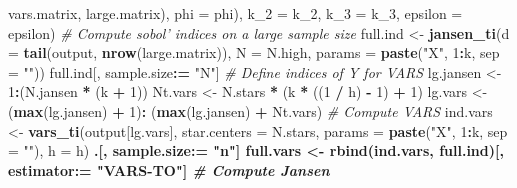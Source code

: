 \documentclass[11pt,]{article}
\newenvironment{Shaded}{\begin{snugshade}}{\end{snugshade}}
\newcommand{\CommentTok}[1]{\textcolor[rgb]{0.56,0.35,0.01}{\textit{#1}}}
\newcommand{\DataTypeTok}[1]{\textcolor[rgb]{0.13,0.29,0.53}{#1}}
\newcommand{\DecValTok}[1]{\textcolor[rgb]{0.00,0.00,0.81}{#1}}
\newcommand{\ErrorTok}[1]{\textcolor[rgb]{0.64,0.00,0.00}{\textbf{#1}}}
\newcommand{\KeywordTok}[1]{\textcolor[rgb]{0.13,0.29,0.53}{\textbf{#1}}}
\newcommand{\NormalTok}[1]{#1}
\newcommand{\OperatorTok}[1]{\textcolor[rgb]{0.81,0.36,0.00}{\textbf{#1}}}
\newcommand{\StringTok}[1]{\textcolor[rgb]{0.31,0.60,0.02}{#1}}
\begin{document}
\begin{Shaded}
\begin{Highlighting}[]
\NormalTok{                                                                         vars.matrix, }
\NormalTok{                                                                         large.matrix), }
                                                               \DataTypeTok{phi =}\NormalTok{ phi), }
                                   \DataTypeTok{k_2 =}\NormalTok{ k_}\DecValTok{2}\NormalTok{, }\DataTypeTok{k_3 =}\NormalTok{ k_}\DecValTok{3}\NormalTok{, }\DataTypeTok{epsilon =}\NormalTok{ epsilon)}
  \CommentTok{# Compute sobol' indices on a large sample size}
\NormalTok{  full.ind <-}\StringTok{ }\KeywordTok{jansen_ti}\NormalTok{(}\DataTypeTok{d =} \KeywordTok{tail}\NormalTok{(output, }\KeywordTok{nrow}\NormalTok{(large.matrix)), }
                        \DataTypeTok{N =}\NormalTok{ N.high, }
                        \DataTypeTok{params =} \KeywordTok{paste}\NormalTok{(}\StringTok{"X"}\NormalTok{, }\DecValTok{1}\OperatorTok{:}\NormalTok{k, }\DataTypeTok{sep =} \StringTok{""}\NormalTok{))}
\NormalTok{  full.ind[, sample.size}\OperatorTok{:}\ErrorTok{=}\StringTok{ "N"}\NormalTok{]}
  \CommentTok{# Define indices of Y for VARS}
\NormalTok{  lg.jansen <-}\StringTok{ }\DecValTok{1}\OperatorTok{:}\NormalTok{(N.jansen }\OperatorTok{*}\StringTok{ }\NormalTok{(k }\OperatorTok{+}\StringTok{ }\DecValTok{1}\NormalTok{))}
\NormalTok{  Nt.vars <-}\StringTok{ }\NormalTok{N.stars }\OperatorTok{*}\StringTok{ }\NormalTok{(k }\OperatorTok{*}\StringTok{ }\NormalTok{((}\DecValTok{1} \OperatorTok{/}\StringTok{ }\NormalTok{h) }\OperatorTok{-}\StringTok{ }\DecValTok{1}\NormalTok{) }\OperatorTok{+}\StringTok{ }\DecValTok{1}\NormalTok{)}
\NormalTok{  lg.vars <-}\StringTok{ }\NormalTok{(}\KeywordTok{max}\NormalTok{(lg.jansen) }\OperatorTok{+}\StringTok{ }\DecValTok{1}\NormalTok{)}\OperatorTok{:}\StringTok{ }\NormalTok{(}\KeywordTok{max}\NormalTok{(lg.jansen) }\OperatorTok{+}\StringTok{ }\NormalTok{Nt.vars)}
  \CommentTok{# Compute VARS}
\NormalTok{  ind.vars <-}\StringTok{ }\KeywordTok{vars_ti}\NormalTok{(output[lg.vars], }\DataTypeTok{star.centers =}\NormalTok{ N.stars, }
                      \DataTypeTok{params =} \KeywordTok{paste}\NormalTok{(}\StringTok{"X"}\NormalTok{, }\DecValTok{1}\OperatorTok{:}\NormalTok{k, }\DataTypeTok{sep =} \StringTok{""}\NormalTok{), }\DataTypeTok{h =}\NormalTok{ h) }\OperatorTok{%>%}
\StringTok{    }\NormalTok{.[, sample.size}\OperatorTok{:}\ErrorTok{=}\StringTok{ "n"}\NormalTok{]}
\NormalTok{  full.vars <-}\StringTok{ }\KeywordTok{rbind}\NormalTok{(ind.vars, full.ind)[, estimator}\OperatorTok{:}\ErrorTok{=}\StringTok{ "VARS-TO"}\NormalTok{]}
  \CommentTok{# Compute Jansen}
}
\end{Highlighting}
\end{Shaded}
\end{document}
